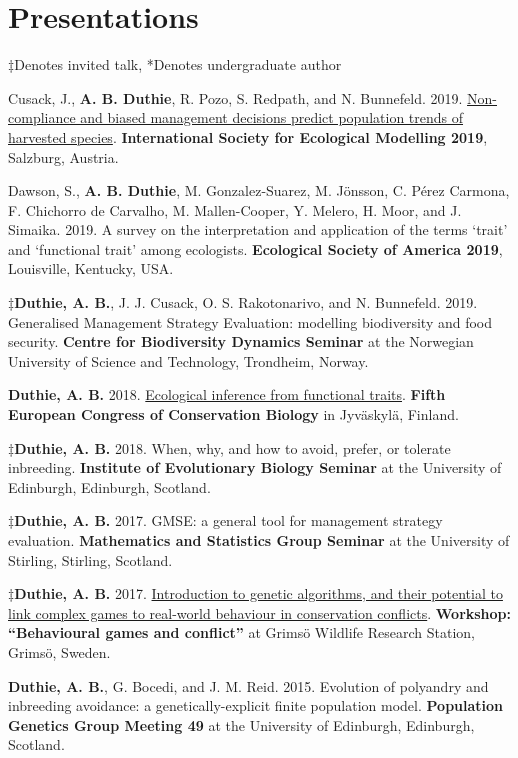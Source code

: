 \documentclass[letterpaper]{article}
\renewenvironment{itemize}{
  \begin{list}{}{
    \setlength{\leftmargin}{1.5em}
  }
}{
  \end{list}
}
\begin{document}
\section*{Presentations}
\begin{itemize}
\item $\ddagger$Denotes invited talk, *Denotes undergraduate author
\item Cusack, J., {\bf A. B. Duthie}, R. Pozo, S. Redpath, and N. Bunnefeld. 2019. \href{http://bradduthie.github.io/talks/duthie_ISEM_2019.pdf}{Non-compliance and biased management decisions predict population trends of harvested species}. {\bf International Society for Ecological Modelling 2019}, Salzburg, Austria.
\item Dawson, S., {\bf A. B. Duthie}, M. Gonzalez-Suarez, M. J\"{o}nsson, C. P\'{e}rez Carmona, F. Chichorro de Carvalho, M. Mallen-Cooper, Y. Melero, H. Moor, and J. Simaika. 2019. A survey on the interpretation and application of the terms `trait' and `functional trait' among ecologists. {\bf Ecological Society of America 2019}, Louisville, Kentucky, USA.
\item $\ddagger${\bf Duthie, A. B.}, J. J. Cusack, O. S. Rakotonarivo, and N. Bunnefeld. 2019. Generalised Management Strategy Evaluation: modelling biodiversity and food security. {\bf Centre for Biodiversity Dynamics Seminar} at the Norwegian University of Science and Technology, Trondheim, Norway.
\item {\bf Duthie, A. B.} 2018. \href{https://www.dropbox.com/s/v42iqdccpkyg55w/Duthie_ECCB2018.pdf?dl=0}{Ecological inference from functional traits}. {\bf Fifth European Congress of Conservation Biology} in Jyv\"{a}skyl\"{a}, Finland.
\item $\ddagger${\bf Duthie, A. B.} 2018. When, why, and how to avoid, prefer, or tolerate inbreeding. {\bf Institute of Evolutionary Biology Seminar} at the University of Edinburgh, Edinburgh, Scotland.
\item $\ddagger${\bf Duthie, A. B.} 2017. GMSE: a general tool for management strategy evaluation. {\bf Mathematics and Statistics Group Seminar} at the University of Stirling, Stirling, Scotland.
\item $\ddagger${\bf Duthie, A. B.} 2017. \href{https://bradduthie.shinyapps.io/GRIMSO}{Introduction to genetic algorithms, and their potential to link complex games to real-world behaviour in conservation conflicts}. {\bf Workshop: ``Behavioural games and conflict''} at Grims\"{o} Wildlife Research Station, Grims\"{o}, Sweden.
\item {\bf Duthie, A. B.}, G. Bocedi, and J. M. Reid. 2015. Evolution of polyandry and inbreeding avoidance: a genetically-explicit finite population model. {\bf Population Genetics Group Meeting 49} at the University of Edinburgh, Edinburgh, Scotland.

\end{itemize}
\end{document}
